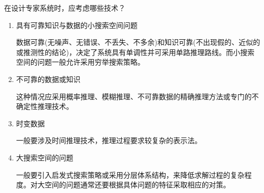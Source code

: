 \begin{question}
在设计专家系统时，应考虑哪些技术？
\end{question}
\begin{solution}
	\begin{enumerate}
		\item 具有可靠知识与数据的小搜索空间问题 \par
		数据可靠(无噪声、无错误、不丢失、不多余)和知识可靠(不出现假的、近似的或推测性的结论)，决定了系统具有单调性并可采用单路推理路线。而小搜索空间的问题一般允许采用穷举搜索策略。 
		\item 不可靠的数据或知识 \par
		这种情况应采用概率推理、模糊推理、不可靠数据的精确推理方法或专门的不确定性推理技术。
		\item 时变数据 \par
		一般要涉及时间推理技术，推理过程要求较复杂的表示法。
		\item 大搜索空间的问题 \par
		一般要引入启发式搜索策略或采用分层体系结构，来降低求解过程的复杂程度。对大空间的问题通常还要根据具体问题的特征采取相应的对策。
	\end{enumerate}
\end{solution}

